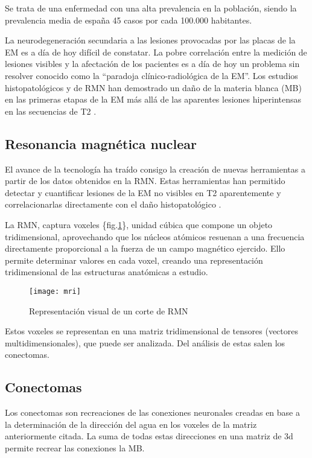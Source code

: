 \documentclass[fleqn,10pt]{UICArticle} %
\begin{document}

Se trata de una enfermedad con una alta prevalencia en la población, siendo  la prevalencia media de españa 45 casos por cada 100.000 habitantes.

La neurodegeneración secundaria a las lesiones provocadas por las placas de la EM es a día de hoy difícil de constatar. La pobre correlación entre la medición de lesiones visibles y la afectación de los pacientes es a día de hoy un problema sin resolver conocido como la “paradoja clínico-radiológica de la EM”. Los estudios histopatológicos y de RMN han demostrado un daño de la materia blanca (MB) en las primeras etapas de la EM más allá de las aparentes lesiones hiperintensas en las secuencias de T2 \cite{Beer2016}.

\subsection{Resonancia magnética nuclear}
El avance de la tecnología ha traído consigo la creación de nuevas herramientas a partir de los datos obtenidos en la RMN. Estas herramientas han permitido detectar y cuantificar lesiones de la EM no visibles en T2 aparentemente y correlacionarlas directamente con el daño histopatológico \cite{Beer2016}.

La RMN, captura voxeles \{fig.\ref{fig:voxeles}\}, unidad cúbica que compone un objeto tridimensional, aprovechando que los núcleos atómicos resuenan a una frecuencia directamente proporcional a la fuerza de un campo magnético ejercido. Ello permite determinar valores en cada voxel, creando una representación tridimensional de las estructuras anatómicas a estudio.

\begin{figure}[ht]
	\centering
	\texttt{[image: mri]}
	\caption{Representación visual de un corte de RMN}
	\label{fig:voxeles}
\end{figure}

Estos voxeles se representan en una matriz tridimensional de tensores (vectores multidimensionales), que puede ser analizada. Del análisis de estas salen los conectomas.

\subsection{Conectomas}
Los conectomas son recreaciones de las conexiones neuronales creadas en base a la determinación de la dirección del agua en los voxeles de la matriz anteriormente citada. La suma de todas estas direcciones en una matriz de 3d permite recrear las conexiones la MB.
\end{document}
